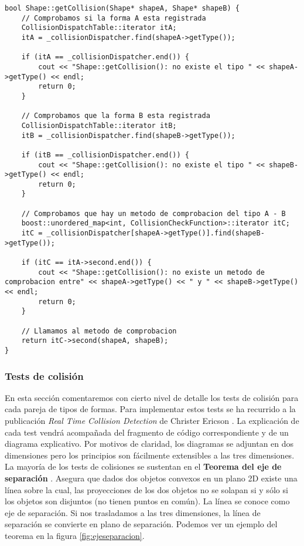 \begin{lstlisting}[style=C++]
bool Shape::getCollision(Shape* shapeA, Shape* shapeB) {
    // Comprobamos si la forma A esta registrada
    CollisionDispatchTable::iterator itA;
    itA = _collisionDispatcher.find(shapeA->getType());
    
    if (itA == _collisionDispatcher.end()) {
        cout << "Shape::getCollision(): no existe el tipo " << shapeA->getType() << endl;
        return 0;
    }
    
    // Comprobamos que la forma B esta registrada
    CollisionDispatchTable::iterator itB;
    itB = _collisionDispatcher.find(shapeB->getType());
    
    if (itB == _collisionDispatcher.end()) {
        cout << "Shape::getCollision(): no existe el tipo " << shapeB->getType() << endl;
        return 0;
    }

    // Comprobamos que hay un metodo de comprobacion del tipo A - B
    boost::unordered_map<int, CollisionCheckFunction>::iterator itC;
    itC = _collisionDispatcher[shapeA->getType()].find(shapeB->getType());
    
    if (itC == itA->second.end()) {
        cout << "Shape::getCollision(): no existe un metodo de comprobacion entre" << shapeA->getType() << " y " << shapeB->getType() << endl;
        return 0;
    }

    // Llamamos al metodo de comprobacion
    return itC->second(shapeA, shapeB);
}
\end{lstlisting}

\subsubsection{Tests de colisión}

En esta sección comentaremos con cierto nivel de detalle los tests de colisión
para cada pareja de tipos de formas. Para implementar estos tests se ha
recurrido a la publicación \textit{Real Time Collision Detection} de 
Christer Ericson \cite{eric05}. La explicación de cada test vendrá acompañada
del fragmento de código correspondiente y de un diagrama explicativo. Por motivos
de claridad, los diagramas se adjuntan en dos dimensiones pero los principios
son fácilmente extensibles a las tres dimensiones.\\

La mayoría de los tests de colisiones se sustentan en el \textbf{Teorema
del eje de separación} \cite{website:ejeseparacion}. Asegura que dados dos
objetos convexos en un plano 2D existe una línea sobre la cual, las proyecciones
de los dos objetos no se solapan si y sólo si los objetos son disjuntos
(no tienen puntos en común). La línea se conoce como eje de separación.
Si nos trasladamos a las tres dimensiones, la línea de separación se convierte
en plano de separación. Podemos ver un ejemplo del teorema en la figura
\ref{fig:ejeseparacion}.\\

